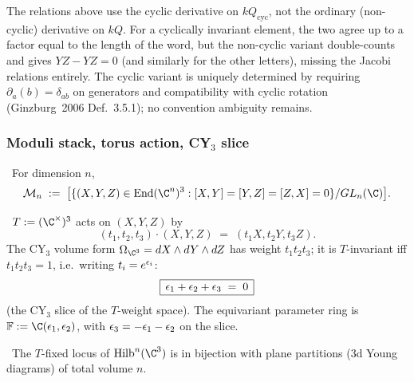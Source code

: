 \begin{remark}
\label{w17:rem:sign-convention}
The relations above use the cyclic derivative on $kQ_{\mathrm{cyc}}$, not the
ordinary (non-cyclic) derivative on $kQ$. For a cyclically invariant element,
the two agree up to a factor equal to the length of the word, but the
non-cyclic variant double-counts and gives $YZ - YZ = 0$ (and similarly for
the other letters), missing the Jacobi relations entirely. The cyclic variant
is uniquely determined by requiring $\partial_a(b) = \delta_{ab}$ on generators
and compatibility with cyclic rotation (Ginzburg~2006 Def.~3.5.1); no convention
ambiguity remains.
\end{remark}

\subsubsection{Moduli stack, torus action, CY$_3$ slice}
\label{w17:subsubsec:moduli-torus-cy3}

\begin{definition}
\label{w17:def:moduli-cn}
\ClaimStatusDefinition\ For dimension $n$,
\[
 \mathcal{M}_n \;:=\; \bigl[\{(X, Y, Z) \in \mathrm{End}(\C^n)^3 :
 [X, Y] = [Y, Z] = [Z, X] = 0\}/GL_n(\C)\bigr].
\]
\end{definition}

\begin{definition}
\label{w17:def:torus-cy3-slice}
\ClaimStatusDefinition\ $T := (\C^\times)^3$ acts on $(X, Y, Z)$ by
\[
 (t_1, t_2, t_3) \cdot (X, Y, Z) \;=\; (t_1 X, t_2 Y, t_3 Z).
\]
The CY$_3$ volume form $\Omega_{\C^3} = dX \wedge dY \wedge dZ$ has weight
$t_1 t_2 t_3$; it is $T$-invariant iff $t_1 t_2 t_3 = 1$, i.e.\ writing
$t_i = e^{\epsilon_i}$:
\[
 \boxed{\,\epsilon_1 + \epsilon_2 + \epsilon_3 \;=\; 0\,}
\]
(the CY$_3$ slice of the $T$-weight space). The equivariant parameter ring is
$\mathbb{F} := \C(\eps_1, \eps_2)$, with $\epsilon_3 = -\epsilon_1 - \epsilon_2$ on the slice.
\end{definition}

\begin{lemma}
\label{w17:lem:plane-partitions}
\ClaimStatusDerivation\ The $T$-fixed locus of $\Hilb^n(\C^3)$ is in bijection with
plane partitions (3d Young diagrams) of total volume $n$.
\end{lemma}

